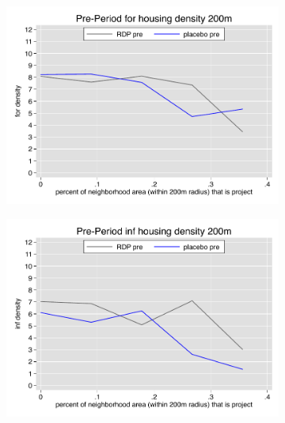 \documentclass[12pt]{article}
\begin{document}
\begin{figure}
        \begin{subfigure}[b]{0.495\textwidth}
            \centering
            \includegraphics[width=\textwidth,trim={0.3cm .3cm 0.1cm 0cm}, clip=true]{figures/overlap_for_200_total_pre.pdf}
        \end{subfigure}
        \hfill
        \begin{subfigure}[b]{0.495\textwidth}  
            \centering 
            \includegraphics[width=\textwidth,trim={0.3cm .3cm 0.1cm 0cm}, clip=true]{figures/overlap_inf_200_total_pre.pdf}
        \end{subfigure}
        \vspace{-6mm}

\end{figure}
\end{document}
